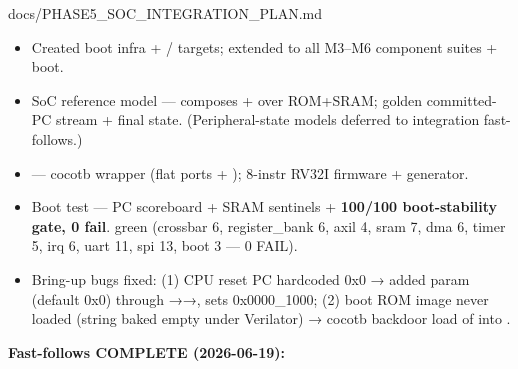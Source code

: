 \begin{relocated}{docs/PHASE5_SOC_INTEGRATION_PLAN.md}
\begin{itemize}
\tightlist
\item
  \ok{} Created  boot infra +
  / targets;  extended
  to all M3--M6 component suites + boot.
\item
  \ok{} SoC reference model  --- composes
   +  over
  ROM+SRAM; golden committed-PC stream + final state. (Peripheral-state
  models deferred to integration fast-follows.)
\item
  \ok{}  --- cocotb wrapper (flat ports
  + );  8-instr RV32I firmware +
  generator.
\item
  \ok{} Boot test  --- PC scoreboard +
  SRAM sentinels + \textbf{100/100 boot-stability gate, 0 fail}.
   green (crossbar 6, register\_\allowbreak{}bank 6, axil
  4, sram 7, dma 6, timer 5, irq 6, uart 11, spi 13, boot 3 --- 0 FAIL).
\item
  \ok{} Bring-up bugs fixed: (1) CPU reset PC hardcoded 0x0 → added
   param (default 0x0) through
  →→,
   sets 0x0000\_\allowbreak{}1000; (2) boot ROM image
  never loaded (string  baked empty under Verilator)
  → cocotb backdoor load of  into .
\end{itemize}

\textbf{Fast-follows \ok{} COMPLETE (2026-06-19):}


\end{relocated}
